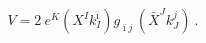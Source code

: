 \begin{equation}\label{Vpot1}
 V = 2 \ e^K (X^I k_I^{\bar\imath})  g_{\bar \imath j}\, (\bar X^J k_J^j) \ .
\end{equation}

